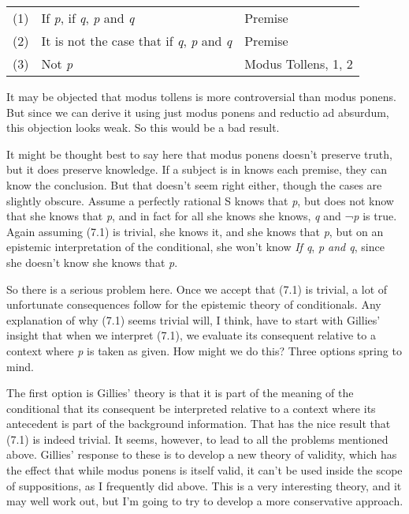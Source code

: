 \documentclass[
  10pt,
  letterpaper,
  DIV=11,
  numbers=noendperiod,
  twoside]{scrartcl}
\begin{document}
\begin{longtable}[]{@{}
  >{\raggedleft\arraybackslash}p{}
  >{\raggedright\arraybackslash}p{}
  >{\raggedright\arraybackslash}p{}@{}}
\toprule\noalign{}
\endhead
\bottomrule\noalign{}
\endlastfoot
(1) & If \emph{p}, if \emph{q}, \emph{p} and \emph{q} & Premise \\
(2) & It is not the case that if \emph{q}, \emph{p} and \emph{q} &
Premise \\
(3) & Not \emph{p} & Modus Tollens, 1, 2 \\
\end{longtable}

It may be objected that modus tollens is more controversial than modus
ponens. But since we can derive it using just modus ponens and reductio
ad absurdum, this objection looks weak. So this would be a bad result.

It might be thought best to say here that modus ponens doesn't preserve
truth, but it does preserve knowledge. If a subject is in knows each
premise, they can know the conclusion. But that doesn't seem right
either, though the cases are slightly obscure. Assume a perfectly
rational S knows that \emph{p}, but does not know that she knows that
\emph{p}, and in fact for all she knows she knows, \emph{q} and
¬\emph{p} is true. Again assuming (7.1) is trivial, she knows it, and
she knows that \emph{p}, but on an epistemic interpretation of the
conditional, she won't know \emph{If q}, \emph{p and q}, since she
doesn't know she knows that \emph{p}.

So there is a serious problem here. Once we accept that (7.1) is
trivial, a lot of unfortunate consequences follow for the epistemic
theory of conditionals. Any explanation of why (7.1) seems trivial will,
I think, have to start with Gillies' insight that when we interpret
(7.1), we evaluate its consequent relative to a context where \emph{p}
is taken as given. How might we do this? Three options spring to mind.

The first option is Gillies' theory is that it is part of the meaning of
the conditional that its consequent be interpreted relative to a context
where its antecedent is part of the background information. That has the
nice result that (7.1) is indeed trivial. It seems, however, to lead to
all the problems mentioned above. Gillies' response to these is to
develop a new theory of validity, which has the effect that while modus
ponens is itself valid, it can't be used inside the scope of
suppositions, as I frequently did above. This is a very interesting
theory, and it may well work out, but I'm going to try to develop a more
conservative approach.
\end{document}
